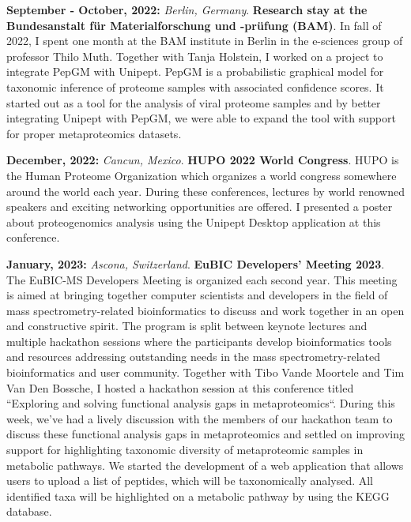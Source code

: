 \textbf{September - October, 2022:} \textit{Berlin, Germany}. \textbf{Research stay at the Bundesanstalt für Materialforschung und -prüfung (BAM)}. In fall of 2022, I spent one month at the BAM institute in Berlin in the e-sciences group of professor Thilo Muth.
Together with Tanja Holstein, I worked on a project to integrate PepGM with Unipept.
PepGM is a probabilistic graphical model for taxonomic inference of proteome samples with associated confidence scores.
It started out as a tool for the analysis of viral proteome samples and by better integrating Unipept with PepGM, we were able to expand the tool with support for proper metaproteomics datasets.

\textbf{December, 2022:} \textit{Cancun, Mexico}. \textbf{HUPO 2022 World Congress}. HUPO is the Human Proteome Organization which organizes a world congress somewhere around the world each year.
During these conferences, lectures by world renowned speakers and exciting networking opportunities are offered.
I presented a poster about proteogenomics analysis using the Unipept Desktop application at this conference.

\textbf{January, 2023:} \textit{Ascona, Switzerland}. \textbf{EuBIC Developers' Meeting 2023}. The EuBIC-MS Developers Meeting is organized each second year.
This meeting is aimed at bringing together computer scientists and developers in the field of mass spectrometry-related bioinformatics to discuss and work together in an open and constructive spirit.
The program is split between keynote lectures and multiple hackathon sessions where the participants develop bioinformatics tools and resources addressing outstanding needs in the mass spectrometry-related bioinformatics and user community.
Together with Tibo Vande Moortele and Tim Van Den Bossche, I hosted a hackathon session at this conference titled ``Exploring and solving functional analysis gaps in metaproteomics``.
During this week, we've had a lively discussion with the members of our hackathon team to discuss these functional analysis gaps in metaproteomics and settled on improving support for highlighting taxonomic diversity of metaproteomic samples in metabolic pathways.
We started the development of a web application that allows users to upload a list of peptides, which will be taxonomically analysed.
All identified taxa will be highlighted on a metabolic pathway by using the KEGG database.

\newpage
